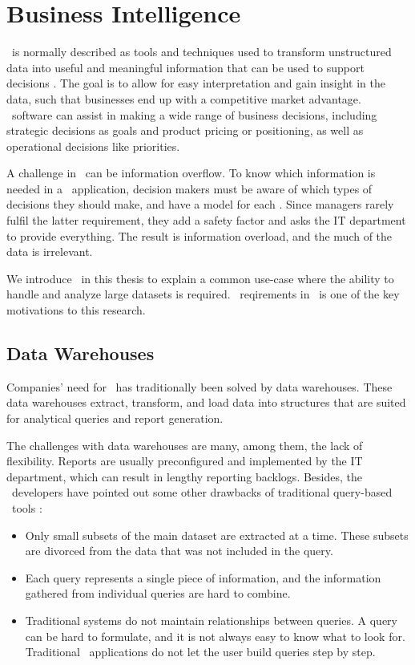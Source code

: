 \section{Business Intelligence}
\label{sec:Business Intelligence}
\bi~is normally described as tools and techniques used to transform unstructured data into useful and meaningful information that can be used to support decisions \cite{Wikipedia_contributors2015-ag}. The goal is to allow for easy interpretation and gain insight in the data, such that businesses end up with a competitive market advantage. \bi~software can assist in making a wide range of business decisions, including strategic decisions as goals and product pricing or positioning, as well as operational decisions like priorities.

A challenge in \bi~can be information overflow. To know which information is needed in a \bi~application, decision makers must be aware of which types of decisions they should make, and have a model for each \cite{Ackoff1999-wk}. Since managers rarely fulfil the latter requirement, they add a safety factor and asks the IT department to provide everything. The result is information overload, and the much of the data is irrelevant. 

We introduce \bi~in this thesis to explain a common use-case where the ability to handle and analyze large datasets is required. \bi~reqirements in \gap~is one of the key motivations to this research. 

\subsection{Data Warehouses}
\label{sub:Data Warehouses}
Companies' need for \bi~has traditionally been solved by data warehouses. These data warehouses extract, transform, and load data into structures that are suited for analytical queries and report generation.

The challenges with data warehouses are many, among them, the lack of flexibility. Reports are usually preconfigured and implemented by the IT department, which can result in lengthy reporting backlogs. Besides, the \qlikview~developers have pointed out some other drawbacks of traditional query-based \bi~tools \cite{Qlik2010-ya}:
\begin{itemize}
  \item Only small subsets of the main dataset are extracted at a time. These subsets are divorced from the data that was not included in the query.
  \item Each query represents a single piece of information, and the information gathered from individual queries are hard to combine.
  \item Traditional systems do not maintain relationships between queries. A query can be hard to formulate, and it is not always easy to know what to look for. Traditional \bi~applications do not let the user build queries step by step.
\end{itemize}

